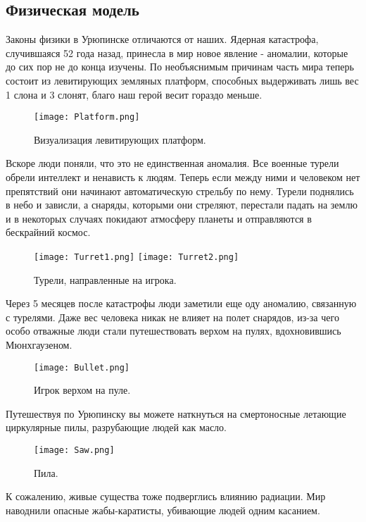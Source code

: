 \documentclass[a4paper,12pt]{article}
\begin{document}
\subsection{Физическая модель}
Законы физики в Урюпинске отличаются от наших.  Ядерная катастрофа, случившаяся 52 года назад, принесла в мир новое явление - аномалии, которые до сих пор не до конца изучены. 
По необъяснимым причинам часть мира теперь состоит из левитирующих земляных платформ, способных выдерживать лишь вес 1 слона и 3 слонят, благо наш герой весит гораздо меньше.
\begin{figure}[H] %
    \centering
    \texttt{[image: Platform.png]} %
    \caption{Визуализация левитирующих платформ.}
    \label{fig:player_character}
\end{figure}
Вскоре люди поняли, что это не единственная аномалия. Все военные турели обрели интеллект и ненависть к людям. Теперь если между ними и человеком нет препятствий они начинают автоматическую стрельбу по нему. Турели поднялись в небо и зависли, а снаряды, которыми они стреляют, перестали падать на землю и в некоторых случаях покидают атмосферу планеты и отправляются в бескрайний космос.
\begin{figure}[H] %
    \centering
    \texttt{[image: Turret1.png]} %
    \texttt{[image: Turret2.png]} %
    \caption{Турели, направленные на игрока.}
    \label{fig:player_character}
\end{figure}
Через 5 месяцев после катастрофы люди заметили еще оду аномалию, связанную с турелями. Даже вес человека никак не влияет на полет снарядов, из-за чего особо отважные люди стали путешествовать верхом на пулях, вдохновившись Мюнхгаузеном.
\begin{figure}[H] %
    \centering
    \texttt{[image: Bullet.png]} %
    \caption{Игрок верхом на пуле.}
    \label{fig:player_character}
\end{figure}
Путешествуя по Урюпинску вы можете наткнуться на смертоносные летающие циркулярные пилы, разрубающие людей как масло.
\begin{figure}[H] %
    \centering
    \texttt{[image: Saw.png]} %
    \caption{Пила.}
    \label{fig:player_character}
\end{figure}
К сожалению, живые существа тоже подверглись влиянию радиации. Мир наводнили опасные жабы-каратисты, убивающие людей одним касанием.
\end{document}

